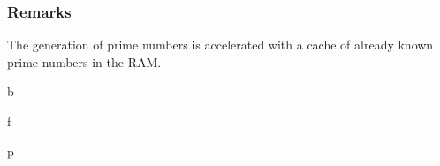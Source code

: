 \documentclass[letterpaper,10pt,english]{sphinxmanual}
\begin{document}
\subsubsection{Remarks}
\label{\detokenize{prime:remarks}}
The generation of prime numbers is accelerated with a cache of already known prime numbers in the RAM.


\renewcommand{\indexname}{Python Module Index}
\begin{sphinxtheindex}
\def\bigletter#1{{\Large\sffamily#1}\nopagebreak\vspace{1mm}}
\bigletter{b}
\item {}
\indexspace
\bigletter{f}
\item {}
\indexspace
\bigletter{p}
\item {}
\end{sphinxtheindex}

\renewcommand{\indexname}{Index}
\printindex
\end{document}
